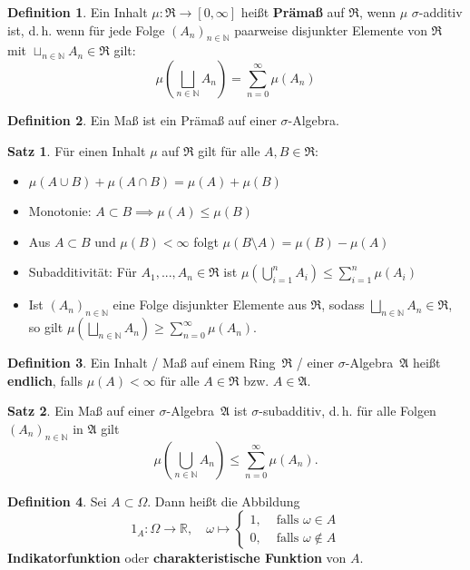 \documentclass[a4paper,10pt,landscape]{article}
\newcommand{\R}{\mathbb{R}}
\newcommand{\N}{\mathbb{N}}
\newcommand{\Alg}{\mathfrak{A}}
\newcommand{\Ring}{\mathfrak{R}}
\theoremstyle{definition}
\newtheorem*{defn}{Definition}
\newtheorem*{satz}{Satz}
\theoremstyle{remark}
\renewcommand{\emph}[1]{\textcolor{Emph}{\bf{#1}}}
\begin{document}
\begin{multicols}{3}
\begin{defn}
  Ein Inhalt $\mu : \Ring \to [0, \infty]$ heißt \emph{Prämaß} auf $\Ring$, wenn $\mu$ $\sigma$-additiv ist, d.\,h. wenn für jede Folge $(A_n)_{n \in \N}$ paarweise disjunkter Elemente von $\Ring$ mit $\sqcup_{n \in \N} A_n \in \Ring$ gilt:
  \[ \mu\left(\bigsqcup_{n \in \N} A_n\right) = \sum_{n=0}^\infty \mu(A_n) \]
\end{defn}

\begin{defn}
  Ein Maß ist ein Prämaß auf einer $\sigma$-Algebra.
\end{defn}

\begin{satz}
  Für einen Inhalt $\mu$ auf $\Ring$ gilt für alle $A, B \in \Ring$:
  \begin{itemize}
    \item $\mu(A \cup B) + \mu(A \cap B) = \mu(A) + \mu(B)$
    \item Monotonie: $A \subset B \implies \mu(A) \leq \mu(B)$
    \item Aus $A \subset B$ und $\mu(B) < \infty$ folgt $\mu(B \setminus A) = \mu(B) - \mu(A)$
    \item Subadditivität: Für $A_1, ..., A_n \in \Ring$ ist $\mu\left(\bigcup_{i = 1}^n A_i \right) \leq \sum_{i = 1}^n \mu(A_i)$
    \item Ist $(A_n)_{n \in \N}$ eine Folge disjunkter Elemente aus $\Ring$, sodass $\bigsqcup_{n \in \N} A_n \in \Ring$, so gilt $\mu(\bigsqcup_{n \in \N} A_n) \geq \sum_{n=0}^\infty \mu(A_n)$.
  \end{itemize}
\end{satz}

\begin{defn}
  Ein Inhalt / Maß auf einem Ring~$\Ring$ / einer $\sigma$-Algebra~$\Alg$ heißt \emph{endlich}, falls $\mu(A) < \infty$ für alle $A \in \Ring$ bzw. $A \in \Alg$.
\end{defn}

\begin{satz}
  Ein Maß auf einer $\sigma$-Algebra~$\Alg$ ist $\sigma$-subadditiv, d.\,h. für alle Folgen $(A_n)_{n \in \N}$ in $\Alg$ gilt
  \[ \mu(\bigcup_{n \in \N} A_n) \leq \sum_{n=0}^\infty \mu(A_n). \]
\end{satz}

\begin{defn}
  Sei $A \subset \Omega$. Dann heißt die Abbildung
  \[ 1_A : \Omega \to \R, \quad \omega \mapsto \begin{cases} 1, & \text{ falls } \omega \in A \\ 0, & \text{ falls } \omega \not\in A \end{cases} \]
  \emph{Indikatorfunktion} oder \emph{charakteristische Funktion} von $A$.
\end{defn}


\end{multicols}
\end{document}
